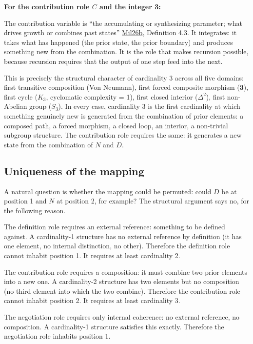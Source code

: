 \documentclass[12pt]{article}
\begin{document}
\textbf{For the contribution role \(C\) and the integer 3:}

The contribution variable is ``the accumulating or synthesizing
parameter; what drives growth or combines past states''
\href{https://github.com/baardev/truevalue/blob/main/docnav/Research/papers/3_minimal-recursive-triadic-framework/3_minimal-recursive-triadic-framework.pdf}{Mil26b},
Definition 4.3. It integrates: it takes what has happened (the prior
state, the prior boundary) and produces something new from the
combination. It is the role that makes recursion possible, because
recursion requires that the output of one step feed into the next.

This is precisely the structural character of cardinality 3 across all
five domains: first transitive composition (Von Neumann), first forced
composite morphism (\(\mathbf{3}\)), first cycle (\(K_3\), cyclomatic
complexity = 1), first closed interior (\(\Delta^2\)), first non-Abelian
group (\(S_3\)). In every case, cardinality 3 is the first cardinality
at which something genuinely new is generated from the combination of
prior elements: a composed path, a forced morphism, a closed loop, an
interior, a non-trivial subgroup structure. The contribution role
requires the same: it generates a new state from the combination of
\(N\) and \(D\).

\subsection{Uniqueness of the mapping}\label{uniqueness-of-the-mapping}

A natural question is whether the mapping could be permuted: could \(D\)
be at position 1 and \(N\) at position 2, for example? The structural
argument says no, for the following reason.

The definition role requires an external reference: something to be
defined against. A cardinality-1 structure has no external reference by
definition (it has one element, no internal distinction, no other).
Therefore the definition role cannot inhabit position 1. It requires at
least cardinality 2.

The contribution role requires a composition: it must combine two prior
elements into a new one. A cardinality-2 structure has two elements but
no composition (no third element into which the two combine). Therefore
the contribution role cannot inhabit position 2. It requires at least
cardinality 3.

The negotiation role requires only internal coherence: no external
reference, no composition. A cardinality-1 structure satisfies this
exactly. Therefore the negotiation role inhabits position 1.
\end{document}
